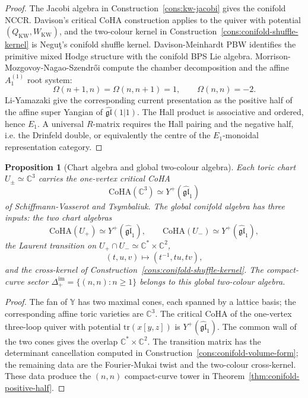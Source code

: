 \documentclass[11pt]{amsart}
\providecommand{\C}{\mathbb{C}}
\providecommand{\bY}{\mathbb{Y}}
\providecommand{\Eone}{E_1}
\providecommand{\CoHA}{\mathrm{CoHA}}
\providecommand{\tr}{\mathrm{tr}}
\theoremstyle{plain}
\newtheorem{proposition}[theorem]{Proposition}
\theoremstyle{definition}
\theoremstyle{remark}
\begin{document}
\begin{proof}
The Jacobi algebra in Construction~\ref{cons:kw-jacobi} gives the
conifold NCCR.  Davison's critical CoHA construction applies to the
quiver with potential \((Q_{\mathrm{KW}},W_{\mathrm{KW}})\), and the
two-colour kernel in Construction~\ref{cons:conifold-shuffle-kernel}
is Negu\c{t}'s conifold shuffle kernel.  Davison-Meinhardt PBW
identifies the primitive mixed Hodge structure with the conifold BPS
Lie algebra.  Morrison-Mozgovoy-Nagao-Szendr\H{o}i compute the chamber
decomposition and the affine \(A_1^{(1)}\) root system:
\[
  \Omega(n+1,n)=\Omega(n,n+1)=1,\qquad
  \Omega(n,n)=-2 .
\]
Li-Yamazaki give the corresponding current presentation as the
positive half of the affine super Yangian of
\(\widehat{\mathfrak{gl}}(1|1)\).  The Hall product is associative and
ordered, hence \(\Eone\).  A universal \(R\)-matrix requires the Hall
pairing and the negative half, i.e. the Drinfeld double, or equivalently
the centre of the \(\Eone\)-monoidal representation category.
\end{proof}

\begin{proposition}[Chart algebra and global two-colour algebra]\label{prop:chart-restriction}
Each toric chart \(U_\pm\simeq\C^3\) carries the one-vertex critical
CoHA
\[
  \CoHA(\C^3)\simeq Y^+(\widehat{\mathfrak{gl}}_1)
\]
of Schiffmann-Vasserot and Tsymbaliuk.  The global conifold algebra has
three inputs: the two chart algebras
\[
  \CoHA(U_+)\simeq Y^+(\widehat{\mathfrak{gl}}_1),
  \qquad
  \CoHA(U_-)\simeq Y^+(\widehat{\mathfrak{gl}}_1),
\]
the Laurent transition on \(U_+\cap U_-\simeq\C^*\times\C^2\),
\[
  (t,u,v)\longmapsto (t^{-1},tu,tv),
\]
and the cross-kernel of Construction~\ref{cons:conifold-shuffle-kernel}.
The compact-curve sector \(\Delta_+^{\mathrm{im}}=\{(n,n):n\geq 1\}\)
belongs to this global two-colour algebra.
\end{proposition}

\begin{proof}
The fan of \(\bY\) has two maximal cones, each spanned by a lattice
basis; the corresponding affine toric varieties are \(\C^3\).  The
critical CoHA of the one-vertex three-loop quiver with potential
\(\tr(x[y,z])\) is \(Y^+(\widehat{\mathfrak{gl}}_1)\).  The common wall
of the two cones gives the overlap \(\C^*\times\C^2\).  The transition
matrix has the determinant cancellation computed in
Construction~\ref{cons:conifold-volume-form}; the remaining data are
the Fourier-Mukai twist and the two-colour cross-kernel.  These data
produce the \((n,n)\) compact-curve tower in
Theorem~\ref{thm:conifold-positive-half}.
\end{proof}
\end{document}
